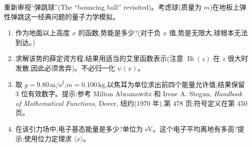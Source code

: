 \begin{question}
重新审视“弹跳球”(The ``bouncing ball'' revisited)。考虑球(质量为 $m$)在地板上弹性弹跳这一经典问题的量子力学模拟。
\begin{enumerate}
\item 作为地面以上高度 $x$ 的函数,势能是多少?(对于负 $x$ 值,势是无限大,球根本无法到达。)
\item 求解该势的薛定谔方程,结果用适当的艾里函数表示(注意 $\operatorname{Bi}(z)$ 在 $z$ 很大时发散,因此必须舍弃)。不必归一化 $\psi(x)$。
\item 取 $g=9.80\,\mathrm{m/s^2}$,$m=0.100\,\mathrm{kg}$,以焦耳为单位求出前四个能量允许值,结果保留 3 位有效数字。提示:参考 Milton Abramowitz 和 Irene A. Stegun, \textit{Handbook of Mathematical Functions}, Dover, 纽约(1970 年),第 478 页;符号定义在第 450 页。
\item 在该引力场中,电子基态能量是多少?单位为 eV。这个电子平均离地有多高?提示:使用位力定理求 $\langle x\rangle$。
\end{enumerate}
\end{question}
